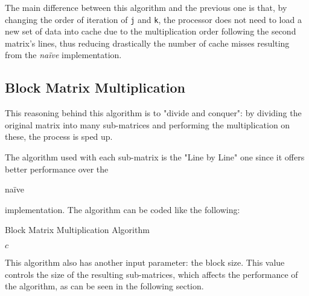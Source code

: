 \documentclass[11pt,a4paper]{article}
\begin{document}
The main difference between this algorithm and the previous one is that, by changing the order of iteration of \lstinline{j} and \lstinline{k}, the processor does not need to load a new set of data into cache due to the multiplication order following the second matrix's lines, thus reducing drastically the number of cache misses resulting from the \emph{naïve} implementation.

\subsection{Block Matrix Multiplication}

This reasoning behind this algorithm is to "divide and conquer": by dividing the original matrix into many sub-matrices and performing the multiplication on these, the process is sped up. 

The algorithm used with each sub-matrix is the "Line by Line" one since it offers better performance over the \begin{em}naïve\end{em} implementation. The algorithm can be coded like the following:

\begin{algorithm}
\caption{Block Matrix Multiplication Algorithm}
\begin{algorithmic}[1]
\EndFor
\EndFor
\EndFor
\EndFor
\EndFor
\EndFor
\State\Return $c$
\EndFunction
\end{algorithmic}
\end{algorithm}

This algorithm also has another input parameter: the block size. This value controls the size of the resulting sub-matrices, which affects the performance of the algorithm, as can be seen in the following section.
\end{document}
